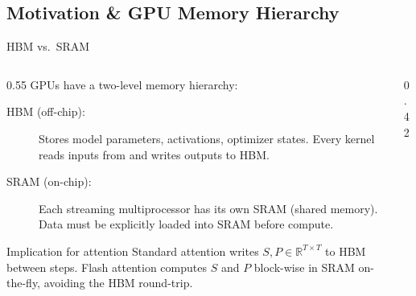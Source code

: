 \subsection{Motivation \& GPU Memory Hierarchy}

\begin{frame}{HBM vs.\ SRAM}

  \begin{columns}
    \begin{column}{0.55\textwidth}
      GPUs have a two-level memory hierarchy:

      \vspace{0.5em}
      \begin{description}
        \item[HBM (off-chip):] Stores model parameters, activations, optimizer states. Every kernel reads inputs from and writes outputs to HBM.
        \item[SRAM (on-chip):] Each streaming multiprocessor has its own SRAM (shared memory). Data must be explicitly loaded into SRAM before compute.
      \end{description}

      \vspace{0.5em}
      \begin{alertblock}{Implication for attention}
        Standard attention writes $S, P \in \mathbb{R}^{T \times T}$ to HBM between steps. Flash attention computes $S$ and $P$ block-wise in SRAM on-the-fly, avoiding the HBM round-trip.
      \end{alertblock}
    \end{column}
    \begin{column}{0.42\textwidth}
      \centering
\end{column}
\end{columns}
\end{frame}
